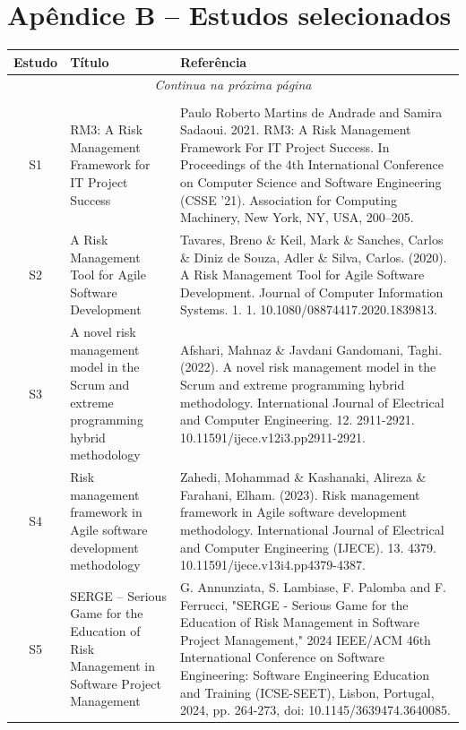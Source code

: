 \documentclass[
	12pt,
	openright,
	twoside,
	a4paper,
	english,
	brazil
	]{abntex2}
\begin{document}
\chapter*{Apêndice B – Estudos selecionados}

\vspace{-2em}  %

\begin{longtable}{|c|p{5.5cm}|p{7.5cm}|}
  \hline
  \textbf{Estudo} & \textbf{Título} & \textbf{Referência} \\
  \hline
  \endfirsthead
  \hline
  \multicolumn{3}{|c|}{\textit{Continua na próxima página}} \\
  \hline
  \endfoot
  \hline
  \multicolumn{3}{|c|}{\textit{Fim da tabela}} \\
  \hline
  \endlastfoot
  S1 & RM3: A Risk Management Framework for IT Project Success & Paulo Roberto Martins de Andrade and Samira Sadaoui. 2021. RM3: A Risk Management Framework For IT Project Success. In Proceedings of the 4th International Conference on Computer Science and Software Engineering (CSSE '21). Association for Computing Machinery, New York, NY, USA, 200–205. \\
  \hline
  S2 & A Risk Management Tool for Agile Software Development & Tavares, Breno \& Keil, Mark \& Sanches, Carlos \& Diniz de Souza, Adler \& Silva, Carlos. (2020). A Risk Management Tool for Agile Software Development. Journal of Computer Information Systems. 1. 1. 10.1080/08874417.2020.1839813. \\
  \hline
  S3 & A novel risk management model in the Scrum and extreme programming hybrid methodology & Afshari, Mahnaz \& Javdani Gandomani, Taghi. (2022). A novel risk management model in the Scrum and extreme programming hybrid methodology. International Journal of Electrical and Computer Engineering. 12. 2911-2921. 10.11591/ijece.v12i3.pp2911-2921. \\
  \hline
  S4 & Risk management framework in Agile software development methodology & Zahedi, Mohammad \& Kashanaki, Alireza \& Farahani, Elham. (2023). Risk management framework in Agile software development methodology. International Journal of Electrical and Computer Engineering (IJECE). 13. 4379. 10.11591/ijece.v13i4.pp4379-4387. \\
  \hline
  S5 & SERGE – Serious Game for the Education of Risk Management in Software Project Management & G. Annunziata, S. Lambiase, F. Palomba and F. Ferrucci, "SERGE - Serious Game for the Education of Risk Management in Software Project Management," 2024 IEEE/ACM 46th International Conference on Software Engineering: Software Engineering Education and Training (ICSE-SEET), Lisbon, Portugal, 2024, pp. 264-273, doi: 10.1145/3639474.3640085. \\

\end{longtable}
\end{document}
